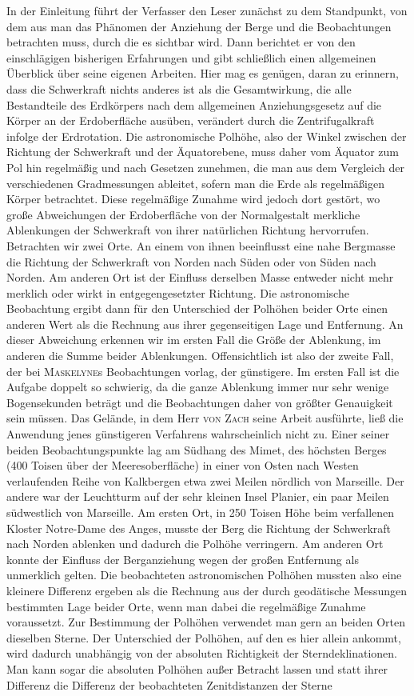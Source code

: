 In der Einleitung führt der Verfasser den Leser zunächst zu dem Standpunkt, von dem aus man das Phänomen der Anziehung der Berge und die Beobachtungen betrachten muss, durch die es sichtbar wird. Dann berichtet er von den einschlägigen bisherigen Erfahrungen und gibt schließlich einen allgemeinen Überblick über seine eigenen Arbeiten. Hier mag es genügen, daran zu erinnern, dass die Schwerkraft nichts anderes ist als die Gesamtwirkung, die alle Bestandteile des Erdkörpers nach dem allgemeinen Anziehungsgesetz auf die Körper an der Erdoberfläche ausüben, verändert durch die Zentrifugalkraft infolge der Erdrotation. Die astronomische Polhöhe, also der Winkel zwischen der Richtung der Schwerkraft und der Äquatorebene, muss daher vom Äquator zum Pol hin regelmäßig und nach Gesetzen zunehmen, die man aus dem Vergleich der verschiedenen Gradmessungen ableitet, sofern man die Erde als regelmäßigen Körper betrachtet. Diese regelmäßige Zunahme wird jedoch dort gestört, wo große Abweichungen der Erdoberfläche von der Normalgestalt merkliche Ablenkungen der Schwerkraft von ihrer natürlichen Richtung hervorrufen. Betrachten wir zwei Orte. An einem von ihnen beeinflusst eine nahe Bergmasse die Richtung der Schwerkraft von Norden nach Süden oder von Süden nach Norden. Am anderen Ort ist der Einfluss derselben Masse entweder nicht mehr merklich oder wirkt in entgegengesetzter Richtung. Die astronomische Beobachtung ergibt dann für den Unterschied der Polhöhen beider Orte einen anderen Wert als die Rechnung aus ihrer gegenseitigen Lage und Entfernung. An dieser Abweichung erkennen wir im ersten Fall die Größe der Ablenkung, im anderen die Summe beider Ablenkungen. Offensichtlich ist also der zweite Fall, der bei \textsc{Maskelyne}s Beobachtungen vorlag, der günstigere. Im ersten Fall ist die Aufgabe doppelt so schwierig, da die ganze Ablenkung immer nur sehr wenige Bogensekunden beträgt und die Beobachtungen daher von größter Genauigkeit sein müssen. Das Gelände, in dem Herr \textsc{von Zach} seine Arbeit ausführte, ließ die Anwendung jenes günstigeren Verfahrens wahrscheinlich nicht zu. Einer seiner beiden Beobachtungspunkte lag am Südhang des Mimet, des höchsten Berges (400 Toisen über der Meeresoberfläche) in einer von Osten nach Westen verlaufenden Reihe von Kalkbergen etwa zwei Meilen nördlich von Marseille. Der andere war der Leuchtturm auf der sehr kleinen Insel Planier, ein paar Meilen südwestlich von Marseille. Am ersten Ort, in 250 Toisen Höhe beim verfallenen Kloster Notre-Dame des Anges, musste der Berg die Richtung der Schwerkraft nach Norden ablenken und dadurch die Polhöhe verringern. Am anderen Ort konnte der Einfluss der Berganziehung wegen der großen Entfernung als unmerklich gelten. Die beobachteten astronomischen Polhöhen mussten also eine kleinere Differenz ergeben als die Rechnung aus der durch geodätische Messungen bestimmten Lage beider Orte, wenn man dabei die regelmäßige Zunahme voraussetzt. Zur Bestimmung der Polhöhen verwendet man gern an beiden Orten dieselben Sterne. Der Unterschied der Polhöhen, auf den es hier allein ankommt, wird dadurch unabhängig von der absoluten Richtigkeit der Sterndeklinationen. Man kann sogar die absoluten Polhöhen außer Betracht lassen und statt ihrer Differenz die Differenz der beobachteten Zenitdistanzen der Sterne 